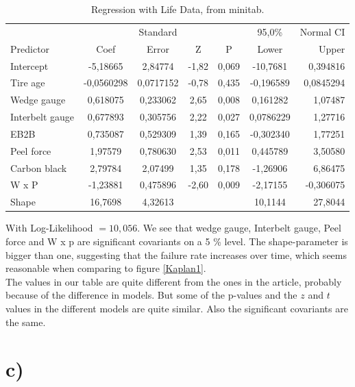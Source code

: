 \documentclass[10pt, a4paper]{article}
\begin{document}
\begin{table}[h!]
\centering

\begin{tabular}{ l c c c c c r }

                   &          & Standard &          &    &  95,0\% & Normal CI\\
Predictor   &           Coef  &    Error &     Z    &  P &     Lower  &    Upper\\
Intercept   &       -5,18665  &  2,84774 & -1,82 & 0,069 &  -10,7681 &  0,394816\\
Tire age    &     -0,0560298  &0,0717152&  -0,78 & 0,435 & -0,196589 & 0,0845294\\
Wedge gauge     &   0,618075   &0,233062&   2,65 & 0,008 &  0,161282 &   1,07487\\
Interbelt gauge &   0,677893   &0,305756&   2,22 & 0,027 & 0,0786229 &   1,27716\\
EB2B            &   0,735087   &0,529309&   1,39 & 0,165 & -0,302340 &   1,77251\\
Peel force      &    1,97579   &0,780630&   2,53 & 0,011 &  0,445789 &   3,50580\\
Carbon black    &    2,79784   & 2,07499&   1,35 & 0,178 &  -1,26906 &   6,86475\\
W x P           &   -1,23881   &0,475896&  -2,60 & 0,009 &  -2,17155 & -0,306075\\
Shape           &    16,7698   & 4,32613&        &       &   10,1144 &   27,8044\\

\end{tabular}
\caption{Regression with Life Data, from minitab.}
   \label{model}
\end{table}


With Log-Likelihood $= 10,056$. We see that wedge gauge, Interbelt gauge, Peel force and W x p are significant covariants on a 5 \% level. The shape-parameter is bigger than one, suggesting that the failure rate increases over time, which seems reasonable when comparing to figure \ref{Kaplan1}.\\
The values in our table are quite different from the ones in the article, probably because of the difference in models. But some of the p-values and the $z$ and $t$ values in the different models are quite similar. Also the significant covariants are the same.

\section*{c)} 	%
\end{document}
